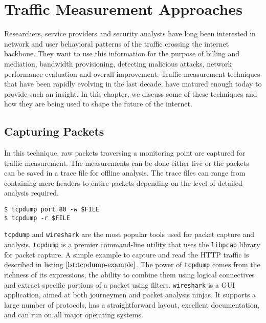 \chapter{Traffic Measurement Approaches}\label{ch:traffic-measurement-approaches}

Researchers, service providers and security analysts have long been interested in network and user behavioral patterns of the traffic crossing the internet backbone. They want to use this information for the purpose of billing and mediation, bandwidth provisioning, detecting malicious attacks, network performance evaluation and overall improvement. Traffic measurement techniques that have been rapidly evolving in the last decade, have matured enough today to provide such an insight. In this chapter, we discuss some of these techniques and how they are being used to shape the future of the internet.

\section{Capturing Packets}\label{sec:capturing-packets}
In this technique, raw packets traversing a monitoring point are captured for traffic measurement. The measurements can be done either live or the packets can be saved in a trace file for offline analysis. The trace files can range from containing mere headers to entire packets depending on the level of detailed analysis required. 

\begin{lstlisting}
$ tcpdump port 80 -w $FILE
$ tcpdump -r $FILE
\end{lstlisting}

\texttt{tcpdump} and \texttt{wireshark} are the most popular tools used for packet capture and analysis. \texttt{tcpdump} \cite{tcpdump-manpage} is a premier command-line utility that uses the \texttt{libpcap} \cite{pcap-manpage} library for packet capture. A simple example to capture and read  the \ac{HTTP} traffic is described in listing $\ref{lst:tcpdump-example}$. The power of \texttt{tcpdump}  comes from the richness of its expressions, the ability to combine them using logical connectives and extract specific portions of a packet using filters. \texttt{wireshark} \cite{wireshark-manpage} is a \ac{GUI} application, aimed at both journeymen and packet analysis  ninjas. It supports a large number of protocols, has a straightforward layout, excellent documentation, and can run on all major operating systems. 

